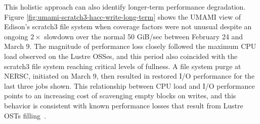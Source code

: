 This holistic approach can also identify longer-term performance degradation.
Figure \ref{fig:umami-scratch3-hacc-write-long-term} shows the UMAMI view of Edison's scratch3 file system when coverage factors were not unusual despite an ongoing $2\times$ slowdown over the normal 50 GiB/sec between February 24 and March 9.
The magnitude of performance loss closely followed the maximum CPU load observed on the Lustre OSSes, and this period also coincided with the scratch3 file system reaching critical levels of fullness.
A file system purge at NERSC, initiated on March 9, then resulted in restored I/O performance for the last three jobs shown.
This relationship between CPU load and I/O performance points to an increasing cost of scavenging empty blocks on writes, and this behavior is consistent with known performance losses that result from Lustre OSTs filling~\cite{oral2014best}.  
